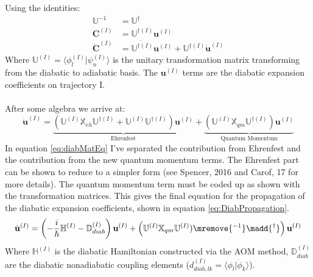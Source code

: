 \noindent Using the identities:
\begin{align}
  \mathbb{U}^{-1} &= \mathbb{U}^{\dagger} \\
  \mathbf{C}^{(I)} &= \mathbb{U}^{\dagger (I)} \mathbf{u}^{(I)} \\
  \dot{\mathbf{C}}^{(I)} &= \dot{\mathbb{U}^{\dagger (I)}} \mathbf{u}^{(I)} + \mathbb{U}^{\dagger (I)}\dot{\mathbf{u}}^{(I)}
\end{align}
Where $\mathbb{U}^{(I)} = \langle \phi_{l}^{(I)} | \psi_{n}^{(I)} \rangle$ is the unitary transformation matrix transforming from the diabatic to adiabatic basis. The $\mathbf{u}^{(I)}$ terms are the diabatic expansion coefficients on trajectory I.
\\\\
\noindent After some algebra we arrive at:
\begin{equation}
  \dot{\mathbf{u}}^{(I)} = \underbrace{\left(\mathbb{U}^{(I)} \mathbb{X}_{eh} \mathbb{U}^{\dagger (I)} + \mathbb{U}^{(I)}\mathbb{U}^{\dagger (I)}\right) \mathbf{u}^{(I)}}_{\text{Ehrenfest}} + \underbrace{\left(\mathbb{U}^{(I)} \mathbb{X}_{qm} \mathbb{U}^{\dagger (I)} \right) \mathbf{u}^{(I)}}_{\text{Quantum Momentum}}
  \label{eq:diabMatEq}
\end{equation}
In equation \eqref{eq:diabMatEq} I've separated the contribution from Ehrenfest and the contribution from the new quantum momentum terms. The Ehrenfest part can be shown to reduce to a simpler form (see Spencer, 2016 \cite{spencer_fob-sh:_2016} and Carof, 17 \cite{carof_detailed_2017} for more details). The quantum momentum term must be coded up as shown \remove{-}with the transformation matrices. This gives the final equation for the propagation of the diabatic expansion coefficients, shown in equation \eqref{eq:DiabPropagation}.
\begin{equation}
	\dot{\mathbf{u}}^{(I)} = \left(-\frac{i}{\hbar} \mathbb{H}^{(I)} - \mathbb{D}^{(I)}_{diab} \right) \mathbf{u}^{(I)} + \left(\mathbb{U}^{(I)} \mathbb{X}_{qm} \mathbb{U}^{(I)})\mremove{^{-1}}\madd{^{\dagger}} \right) \mathbf{u}^{(I)}
  \label{eq:DiabPropagation}
\end{equation}
Where $\mathbb{H}^{(I)}$ is the diabatic Hamiltonian constructed via the AOM method, $\mathbb{D}_{diab}^{(I)}$ are the diabatic nonadiabatic coupling elements ($d_{diab, lk}^{(I)} = \langle \phi_{l} | \dot{\phi}_{k} \rangle$).

